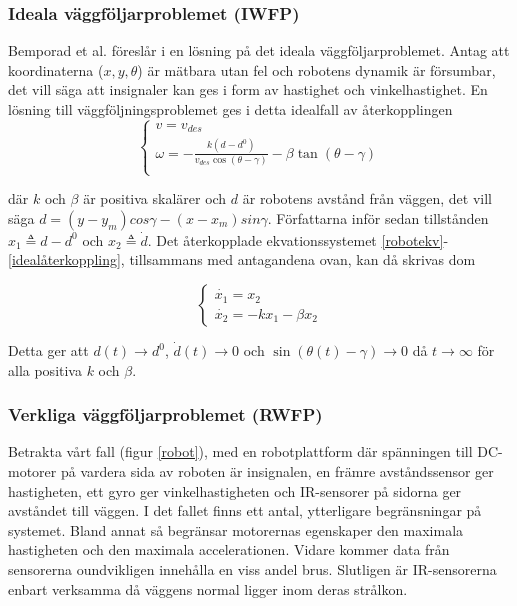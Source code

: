 \documentclass[11pt]{article}
\begin{document}
\begin{flushleft}
\subsubsection{Ideala väggföljarproblemet (IWFP)}
Bemporad et al. föreslår i \cite{wfp} en lösning på det ideala väggföljarproblemet. Antag att  koordinaterna (\(x, y, \theta\)) är mätbara utan fel och robotens dynamik är försumbar, det vill säga att insignaler kan ges i form av hastighet och vinkelhastighet. En lösning till väggföljningsproblemet ges i detta idealfall av återkopplingen
\begin{equation}\label{idealåterkoppling}
	\begin{cases}
	v = v_{des} \\
	\omega = -\frac{k(d - d^0)}{v_{des} \cos (\theta - \gamma)} - \beta \tan (\theta - \gamma) \\
	\end{cases}
\end{equation}

där \(k\) och \(\beta\) är positiva skalärer och \(d\) är robotens avstånd från väggen, det vill säga \(d = (y - y_m)cos\gamma - (x - x_m)sin\gamma\). Författarna inför sedan tillstånden \(x_1 \triangleq d - d^0\) och \(x_2 \triangleq \dot{d}\).  Det återkopplade ekvationssystemet \eqref{robotekv}-\eqref{idealåterkoppling}, tillsammans med antagandena ovan, kan då skrivas dom

\begin{equation}
	\begin{cases}
	\dot{x_1} = x_2 \\
	\dot{x_2} = -kx_1 - \beta x_2
	\end{cases}
\end{equation}

Detta ger att \(d(t) \to d^0\), \(\dot{d}(t) \to 0\) och \(\sin (\theta(t) - \gamma) \to 0\) då $t \to \infty$ för alla positiva $k$ och $\beta$.

\subsubsection{Verkliga väggföljarproblemet (RWFP)}\label{rwfp}
Betrakta vårt fall (figur \ref{robot}), med en robotplattform där spänningen till DC-motorer på vardera sida av roboten är insignalen, en främre avståndssensor ger hastigheten, ett gyro ger vinkelhastigheten och IR-sensorer på sidorna ger avståndet till väggen. I det fallet finns ett antal, ytterligare begränsningar på systemet. Bland annat så begränsar motorernas egenskaper den maximala hastigheten och den maximala accelerationen. Vidare kommer data från sensorerna oundvikligen innehålla en viss andel brus. Slutligen är IR-sensorerna enbart verksamma då  väggens normal ligger inom deras strålkon.


\end{flushleft}
\end{document}
